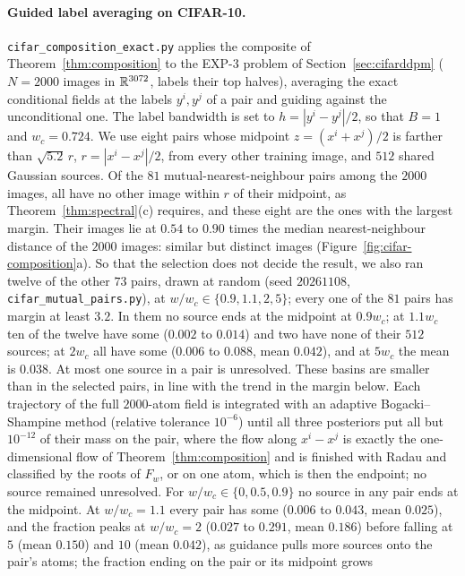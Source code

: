 \documentclass{article} %
\theoremstyle{plain}
\theoremstyle{definition}
\theoremstyle{remark}
\begin{document}
\paragraph{Guided label averaging on CIFAR-10.}
\label{app:cifar-composition}
\texttt{cifar\_composition\_exact.py} applies the composite of Theorem~\ref{thm:composition} to the
EXP-3 problem of Section~\ref{sec:cifarddpm} ($N=2000$ images in $\mathbb{R}^{3072}$, labels their top
halves), averaging the exact conditional fields at the labels $y^i,y^j$ of a pair and guiding
against the unconditional one. The label bandwidth is set to $h=|y^i-y^j|/2$, so that $B=1$ and
$w_c=0.724$. We use eight pairs whose midpoint $z=(x^i+x^j)/2$ is farther than
$\sqrt{5.2}\,r$, $r=|x^i-x^j|/2$, from every other training image, and $512$ shared Gaussian
sources. Of the $81$ mutual-nearest-neighbour pairs among the $2000$ images, all have no other
image within $r$ of their midpoint, as Theorem~\ref{thm:spectral}(c) requires, and these eight
are the ones with the largest margin. Their images lie at $0.54$ to $0.90$ times the median
nearest-neighbour distance of the $2000$ images: similar but distinct images
(Figure~\ref{fig:cifar-composition}a). So that the selection does not decide the result, we also
ran twelve of the other $73$ pairs, drawn at random (seed $20261108$,
\texttt{cifar\_mutual\_pairs.py}), at $w/w_c\in\{0.9,1.1,2,5\}$; every one of the $81$ pairs has
margin at least $3.2$. In them no source ends at the midpoint at $0.9w_c$; at $1.1w_c$ ten of the
twelve have some ($0.002$ to $0.014$) and two have none of their $512$ sources; at $2w_c$ all
have some ($0.006$ to $0.088$, mean $0.042$), and at $5w_c$ the mean is $0.038$. At most one
source in a pair is unresolved. These basins are smaller than in the selected pairs, in line
with the trend in the margin below. Each trajectory of the full $2000$-atom field is integrated with an adaptive
Bogacki--Shampine method (relative tolerance $10^{-6}$) until all three posteriors put all but
$10^{-12}$ of their mass on the pair, where the flow along $x^i-x^j$ is exactly the
one-dimensional flow of Theorem~\ref{thm:composition} and is finished with Radau and classified by
the roots of $F_w$, or on one atom, which is then the endpoint; no source remained unresolved.
For $w/w_c\in\{0,0.5,0.9\}$ no source in any pair ends at the midpoint. At $w/w_c=1.1$ every
pair has some ($0.006$ to $0.043$, mean $0.025$), and the fraction peaks at $w/w_c=2$ ($0.027$ to
$0.291$, mean $0.186$) before falling at $5$ (mean $0.150$) and $10$ (mean $0.042$), as guidance
pulls more sources onto the pair's atoms; the fraction ending on the pair or its midpoint grows
\end{document}
